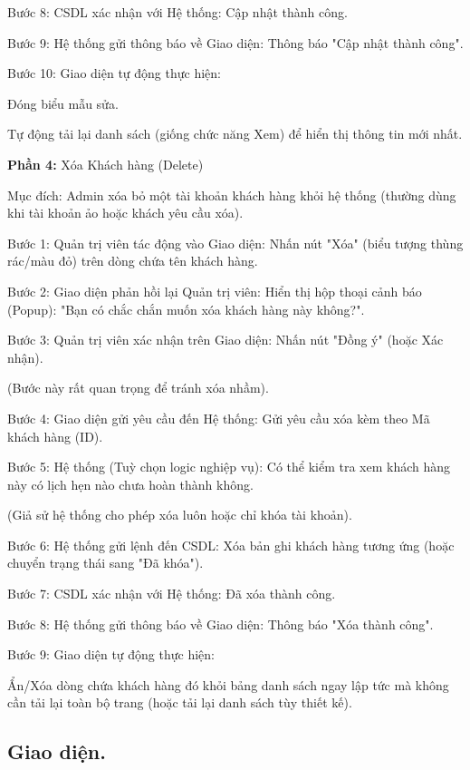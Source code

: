 \documentclass[../BTL.tex]{subfiles}
\begin{document}
Bước 8: CSDL xác nhận với Hệ thống: Cập nhật thành công.

Bước 9: Hệ thống gửi thông báo về Giao diện: Thông báo "Cập nhật thành
công".

Bước 10: Giao diện tự động thực hiện:

Đóng biểu mẫu sửa.

Tự động tải lại danh sách (giống chức năng Xem) để hiển thị thông tin
mới nhất.


\textbf{Phần 4:} Xóa Khách hàng (Delete)

Mục đích: Admin xóa bỏ một tài khoản khách hàng khỏi hệ thống (thường
dùng khi tài khoản ảo hoặc khách yêu cầu xóa).

Bước 1: Quản trị viên tác động vào Giao diện: Nhấn nút "Xóa" (biểu tượng
thùng rác/màu đỏ) trên dòng chứa tên khách hàng.

Bước 2: Giao diện phản hồi lại Quản trị viên: Hiển thị hộp thoại cảnh
báo (Popup): "Bạn có chắc chắn muốn xóa khách hàng này không?".

Bước 3: Quản trị viên xác nhận trên Giao diện: Nhấn nút "Đồng ý" (hoặc
Xác nhận).

(Bước này rất quan trọng để tránh xóa nhầm).

Bước 4: Giao diện gửi yêu cầu đến Hệ thống: Gửi yêu cầu xóa kèm theo Mã
khách hàng (ID).

Bước 5: Hệ thống (Tuỳ chọn logic nghiệp vụ): Có thể kiểm tra xem khách
hàng này có lịch hẹn nào chưa hoàn thành không.

(Giả sử hệ thống cho phép xóa luôn hoặc chỉ khóa tài khoản).

Bước 6: Hệ thống gửi lệnh đến CSDL: Xóa bản ghi khách hàng tương ứng
(hoặc chuyển trạng thái sang "Đã khóa").

Bước 7: CSDL xác nhận với Hệ thống: Đã xóa thành công.

Bước 8: Hệ thống gửi thông báo về Giao diện: Thông báo "Xóa thành công".

Bước 9: Giao diện tự động thực hiện:

Ẩn/Xóa dòng chứa khách hàng đó khỏi bảng danh sách ngay lập tức mà không
cần tải lại toàn bộ trang (hoặc tải lại danh sách tùy thiết kế).

\subsection{Giao diện.}

\end{document}
